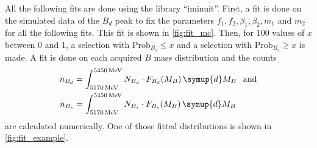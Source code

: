 All the following fits are done using the library \enquote{iminuit}\cite{iminuit}.
First, a fit is done on the simulated data of the $B_d$ peak to fix the parameters $f_1,f_2,\beta_1,\beta_2,m_1$ and $m_2$ for all the following fits. 
This fit is shown in \cref{fig:fit_mc}.
Then, for 100 values of $x$ between 0 and 1, a selection with $\text{Prob}_{B_s} \leq x$ and a selection with $\text{Prob}_{B_s} \geq x$ is made.
A fit is done on each acquired $B$ mass distribution and the counts
\begin{align*}
    n_{B_d} &= \int_{\qty{5170}{\MeV}}^{\qty{5450}{\MeV}} N_{B_d} \cdot F_{B_d}(M_B) \, \symup{d}M_B \:\:\text{ and} \\
    n_{B_s} &= \int_{\qty{5170}{\MeV}}^{\qty{5450}{\MeV}} N_{B_s} \cdot F_{B_s}(M_B) \, \symup{d}M_B
\end{align*}
are calculated numerically.
One of those fitted distributions is shown in \cref{fig:fit_example}.

